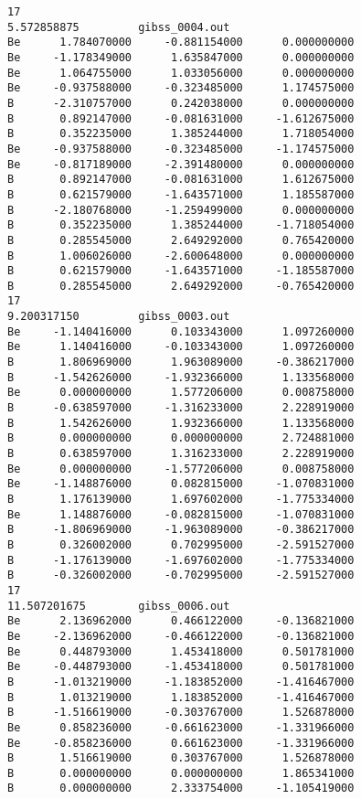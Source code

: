 \documentclass[prb,aps,preprint,showkeys,showpacs]{revtex4}
\begin{document}
\begin{verbatim}
17    
5.572858875         gibss_0004.out
Be      1.784070000     -0.881154000      0.000000000
Be     -1.178349000      1.635847000      0.000000000
Be      1.064755000      1.033056000      0.000000000
Be     -0.937588000     -0.323485000      1.174575000
B      -2.310757000      0.242038000      0.000000000
B       0.892147000     -0.081631000     -1.612675000
B       0.352235000      1.385244000      1.718054000
Be     -0.937588000     -0.323485000     -1.174575000
Be     -0.817189000     -2.391480000      0.000000000
B       0.892147000     -0.081631000      1.612675000
B       0.621579000     -1.643571000      1.185587000
B      -2.180768000     -1.259499000      0.000000000
B       0.352235000      1.385244000     -1.718054000
B       0.285545000      2.649292000      0.765420000
B       1.006026000     -2.600648000      0.000000000
B       0.621579000     -1.643571000     -1.185587000
B       0.285545000      2.649292000     -0.765420000
17    
9.200317150         gibss_0003.out
Be     -1.140416000      0.103343000      1.097260000
Be      1.140416000     -0.103343000      1.097260000
B       1.806969000      1.963089000     -0.386217000
B      -1.542626000     -1.932366000      1.133568000
Be      0.000000000      1.577206000      0.008758000
B      -0.638597000     -1.316233000      2.228919000
B       1.542626000      1.932366000      1.133568000
B       0.000000000      0.000000000      2.724881000
B       0.638597000      1.316233000      2.228919000
Be      0.000000000     -1.577206000      0.008758000
Be     -1.148876000      0.082815000     -1.070831000
B       1.176139000      1.697602000     -1.775334000
Be      1.148876000     -0.082815000     -1.070831000
B      -1.806969000     -1.963089000     -0.386217000
B       0.326002000      0.702995000     -2.591527000
B      -1.176139000     -1.697602000     -1.775334000
B      -0.326002000     -0.702995000     -2.591527000
17    
11.507201675        gibss_0006.out
Be      2.136962000      0.466122000     -0.136821000
Be     -2.136962000     -0.466122000     -0.136821000
Be      0.448793000      1.453418000      0.501781000
Be     -0.448793000     -1.453418000      0.501781000
B      -1.013219000     -1.183852000     -1.416467000
B       1.013219000      1.183852000     -1.416467000
B      -1.516619000     -0.303767000      1.526878000
Be      0.858236000     -0.661623000     -1.331966000
Be     -0.858236000      0.661623000     -1.331966000
B       1.516619000      0.303767000      1.526878000
B       0.000000000      0.000000000      1.865341000
B       0.000000000      2.333754000     -1.105419000

\end{verbatim}
\end{document}
